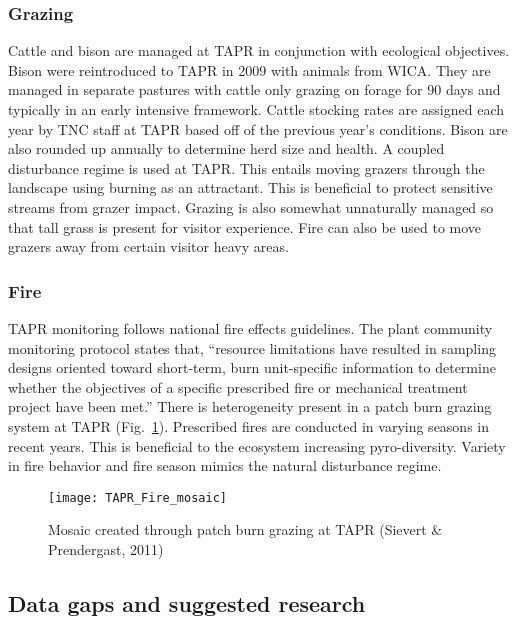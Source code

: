 \subsubsection{Grazing }

Cattle and bison are managed at TAPR in conjunction with ecological objectives. 
Bison were reintroduced to TAPR in 2009 with animals from WICA. 
They are managed in separate pastures with cattle only grazing on forage for 90 days and typically in an early intensive framework. 
Cattle stocking rates are assigned each year by TNC staff at TAPR based off of the previous year's conditions. 
Bison are also rounded up annually to determine herd size and health.
 A coupled disturbance regime is used at TAPR. 
This entails moving grazers through the landscape using burning as an attractant. 
This is beneficial to protect sensitive streams from grazer impact. 
Grazing is also somewhat unnaturally managed so that tall grass is present for visitor experience. 
Fire can also be used to move grazers away from certain visitor heavy areas.

\subsubsection{Fire }

TAPR monitoring follows national fire effects guidelines. 
The plant community monitoring protocol states that, ``resource limitations have
resulted in sampling designs oriented toward short-term, burn unit-specific information to determine whether the objectives of a specific prescribed fire or mechanical treatment project have been met.'' 
There is heterogeneity present in a patch burn grazing system at TAPR (Fig.~\ref{fig:TAPRfiremosaic}). 
Prescribed fires are conducted in varying seasons in recent years. 
This is beneficial to the ecosystem increasing pyro-diversity. 
Variety in fire behavior and fire season mimics the natural disturbance regime.

\begin{figure}
	\texttt{[image: TAPR\_Fire\_mosaic]}
	\caption[TAPR fire mosaic]
	{Mosaic created through patch burn grazing at TAPR (Sievert \& Prendergast, 2011) }
	\label{fig:TAPRfiremosaic}
\end{figure}

\subsection{Data gaps and suggested research}

